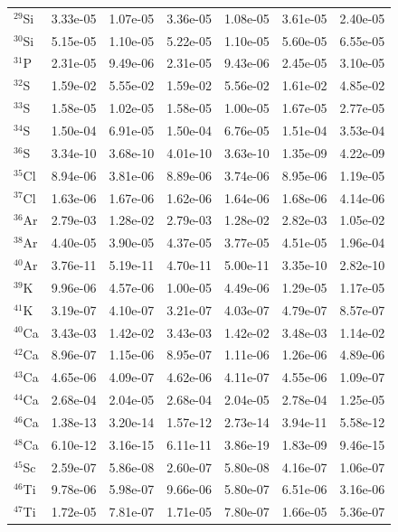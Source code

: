 \begin{table}
\begin{tabular}{l|cc|cc|cc}
$^{29}$Si & 3.33e-05 & 1.07e-05 & 3.36e-05 & 1.08e-05 & 3.61e-05 & 2.40e-05\\
$^{30}$Si & 5.15e-05 & 1.10e-05 & 5.22e-05 & 1.10e-05 & 5.60e-05 & 6.55e-05\\
$^{31}$P & 2.31e-05 & 9.49e-06 & 2.31e-05 & 9.43e-06 & 2.45e-05 & 3.10e-05\\
$^{32}$S & 1.59e-02 & 5.55e-02 & 1.59e-02 & 5.56e-02 & 1.61e-02 & 4.85e-02\\
$^{33}$S & 1.58e-05 & 1.02e-05 & 1.58e-05 & 1.00e-05 & 1.67e-05 & 2.77e-05\\
$^{34}$S & 1.50e-04 & 6.91e-05 & 1.50e-04 & 6.76e-05 & 1.51e-04 & 3.53e-04\\
$^{36}$S & 3.34e-10 & 3.68e-10 & 4.01e-10 & 3.63e-10 & 1.35e-09 & 4.22e-09\\
$^{35}$Cl & 8.94e-06 & 3.81e-06 & 8.89e-06 & 3.74e-06 & 8.95e-06 & 1.19e-05\\
$^{37}$Cl & 1.63e-06 & 1.67e-06 & 1.62e-06 & 1.64e-06 & 1.68e-06 & 4.14e-06\\
$^{36}$Ar & 2.79e-03 & 1.28e-02 & 2.79e-03 & 1.28e-02 & 2.82e-03 & 1.05e-02\\
$^{38}$Ar & 4.40e-05 & 3.90e-05 & 4.37e-05 & 3.77e-05 & 4.51e-05 & 1.96e-04\\
$^{40}$Ar & 3.76e-11 & 5.19e-11 & 4.70e-11 & 5.00e-11 & 3.35e-10 & 2.82e-10\\
$^{39}$K & 9.96e-06 & 4.57e-06 & 1.00e-05 & 4.49e-06 & 1.29e-05 & 1.17e-05\\
$^{41}$K & 3.19e-07 & 4.10e-07 & 3.21e-07 & 4.03e-07 & 4.79e-07 & 8.57e-07\\
$^{40}$Ca & 3.43e-03 & 1.42e-02 & 3.43e-03 & 1.42e-02 & 3.48e-03 & 1.14e-02\\
$^{42}$Ca & 8.96e-07 & 1.15e-06 & 8.95e-07 & 1.11e-06 & 1.26e-06 & 4.89e-06\\
$^{43}$Ca & 4.65e-06 & 4.09e-07 & 4.62e-06 & 4.11e-07 & 4.55e-06 & 1.09e-07\\
$^{44}$Ca & 2.68e-04 & 2.04e-05 & 2.68e-04 & 2.04e-05 & 2.78e-04 & 1.25e-05\\
$^{46}$Ca & 1.38e-13 & 3.20e-14 & 1.57e-12 & 2.73e-14 & 3.94e-11 & 5.58e-12\\
$^{48}$Ca & 6.10e-12 & 3.16e-15 & 6.11e-11 & 3.86e-19 & 1.83e-09 & 9.46e-15\\
$^{45}$Sc & 2.59e-07 & 5.86e-08 & 2.60e-07 & 5.80e-08 & 4.16e-07 & 1.06e-07\\
$^{46}$Ti & 9.78e-06 & 5.98e-07 & 9.66e-06 & 5.80e-07 & 6.51e-06 & 3.16e-06\\
$^{47}$Ti & 1.72e-05 & 7.81e-07 & 1.71e-05 & 7.80e-07 & 1.66e-05 & 5.36e-07\\

\end{tabular}
\end{table}
